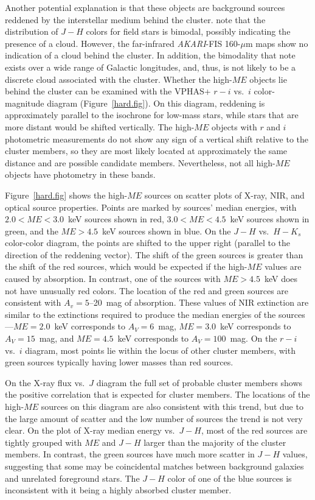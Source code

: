 \documentclass[twocolumn,tighten]{aastex61}
\begin{document}
Another potential explanation is that these objects are background sources reddened by the interstellar medium behind the cluster.  note that the distribution of $J-H$ colors for field stars is bimodal, possibly indicating the presence of a cloud. However, the far-infrared {\it AKARI}-FIS 160-$\mu$m maps \citep{2007PASJ...59S.389K} show no indication of a cloud behind the cluster. In addition, the bimodality that  note exists over a wide range of Galactic longitudes, and, thus, is not likely to be a discrete cloud associated with the cluster. Whether the high-$ME$ objects lie behind the cluster can be examined with the VPHAS+ $r-i$ vs.\ $i$ color-magnitude diagram (Figure~\ref{hard.fig}). On this diagram, reddening is approximately parallel to the isochrone for low-mass stars, while stars that are more distant would be shifted vertically.  The high-$ME$ objects with $r$ and $i$ photometric measurements do not show any sign of a vertical shift relative to the cluster members, so they are most likely located at approximately the same distance and are possible candidate members. Nevertheless, not all high-$ME$ objects have photometry in these bands.

Figure~\ref{hard.fig} shows the high-$ME$ sources on scatter plots of X-ray, NIR, and optical source properties. Points are marked by sources' median energies, with $2.0<ME<3.0$~keV sources shown in red, $3.0<ME<4.5$~keV sources shown in green, and the $ME>4.5$~keV sources shown in blue. On the $J-H$ vs.\ $H-K_s$ color-color diagram, the points are shifted to the upper right (parallel to the direction of the reddening vector). The shift of the green sources is greater than the shift of the red sources, which would be expected if the high-$ME$ values are caused by absorption. In contrast, one of the sources with $ME>4.5$~keV does not have unusually red colors. The location of the red and green sources are consistent with $A_v=5$--20~mag of absorption.
These values of NIR extinction are similar to the extinctions required to produce the median energies of the sources---$ME=2.0$~keV corresponds to $A_V=6$~mag, $ME=3.0$~keV corresponds to $A_V=15$~mag, and $ME=4.5$~keV corresponds to $A_V=100$~mag. 
On the $r-i$ vs.\ $i$ diagram, most points lie within the locus of other cluster members, with green sources typically having lower masses than red sources.  

On the X-ray flux vs.\ $J$ diagram the full set of probable cluster members shows the positive correlation that is expected for cluster members. The locations of the high-$ME$ sources on this diagram are also consistent with this trend, but due to the large amount of scatter and the low number of sources the trend is not very clear. On the plot of X-ray median energy vs.\ $J-H$, most of the red sources are tightly grouped with $ME$ and $J-H$ larger than the majority of the cluster members. In contrast, the green sources have much more scatter in $J-H$ values, suggesting that some may be coincidental matches between background galaxies and unrelated foreground stars. The $J-H$ color of one of the blue sources is inconsistent with it being a highly absorbed cluster member. 
\end{document}

